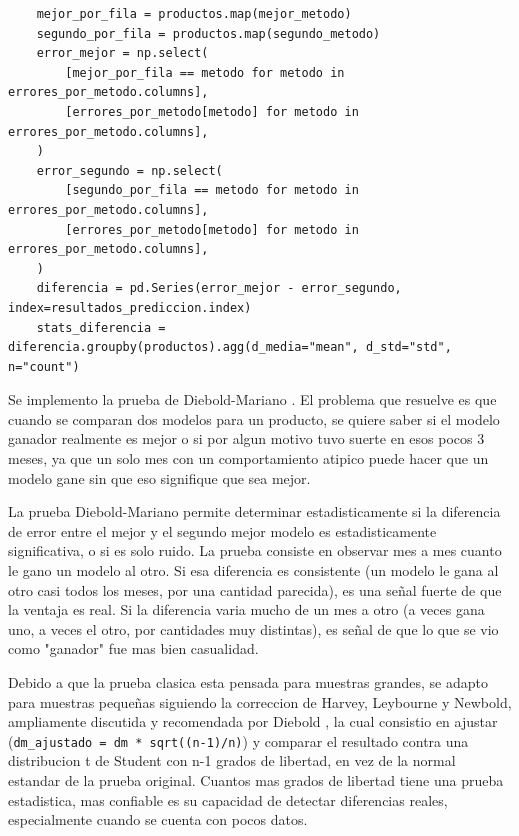 \label{lst:campeon_diferencias}
\begin{verbatim}
    mejor_por_fila = productos.map(mejor_metodo)
    segundo_por_fila = productos.map(segundo_metodo)
    error_mejor = np.select(
        [mejor_por_fila == metodo for metodo in errores_por_metodo.columns],
        [errores_por_metodo[metodo] for metodo in errores_por_metodo.columns],
    )
    error_segundo = np.select(
        [segundo_por_fila == metodo for metodo in errores_por_metodo.columns],
        [errores_por_metodo[metodo] for metodo in errores_por_metodo.columns],
    )
    diferencia = pd.Series(error_mejor - error_segundo, index=resultados_prediccion.index)
    stats_diferencia = diferencia.groupby(productos).agg(d_media="mean", d_std="std", n="count")
\end{verbatim}

Se implemento la prueba de Diebold-Mariano \cite{diebold_mariano}. El problema que resuelve es que cuando se comparan dos modelos para un producto, se quiere saber si el modelo ganador realmente es mejor o si por algun motivo tuvo suerte en esos pocos 3 meses, ya que un solo mes con un comportamiento atipico puede hacer que un modelo gane sin que eso signifique que sea mejor.

La prueba Diebold-Mariano permite determinar estadisticamente si la diferencia de error entre el mejor y el segundo mejor modelo es estadisticamente significativa, o si es solo ruido. La prueba consiste en observar mes a mes cuanto le gano un modelo al otro. Si esa diferencia es consistente (un modelo le gana al otro casi todos los meses, por una cantidad parecida), es una señal fuerte de que la ventaja es real. Si la diferencia varia mucho de un mes a otro (a veces gana uno, a veces el otro, por cantidades muy distintas), es señal de que lo que se vio como "ganador" fue mas bien casualidad.

Debido a que la prueba clasica esta pensada para muestras grandes, se adapto para muestras pequeñas siguiendo la correccion de Harvey, Leybourne y Newbold, ampliamente discutida y recomendada por Diebold \cite{diebold2015comparing}, la cual consistio en ajustar (\texttt{dm\_ajustado = dm * sqrt((n-1)/n)}) y comparar el resultado contra una distribucion t de Student con n-1 grados de libertad, en vez de la normal estandar de la prueba original. Cuantos mas grados de libertad tiene una prueba estadistica, mas confiable es su capacidad de detectar diferencias reales, especialmente cuando se cuenta con pocos datos.

